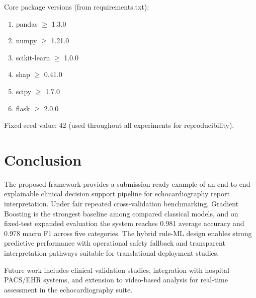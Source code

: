 \documentclass[10pt,twocolumn,letterpaper]{IEEEtran}
\begin{document}
Core package versions (from requirements.txt):
\begin{enumerate}
\item pandas $\geq$ 1.3.0
\item numpy $\geq$ 1.21.0
\item scikit-learn $\geq$ 1.0.0
\item shap $\geq$ 0.41.0
\item scipy $\geq$ 1.7.0
\item flask $\geq$ 2.0.0
\end{enumerate}

Fixed seed value: 42 (used throughout all experiments for reproducibility).

\section{Conclusion}
The proposed framework provides a submission-ready example of an end-to-end explainable clinical decision support pipeline for echocardiography report interpretation. Under fair repeated cross-validation benchmarking, Gradient Boosting is the strongest baseline among compared classical models, and on fixed-test expanded evaluation the system reaches 0.981 average accuracy and 0.978 macro F1 across five categories. The hybrid rule-ML design enables strong predictive performance with operational safety fallback and transparent interpretation pathways suitable for translational deployment studies.

Future work includes clinical validation studies, integration with hospital PACS/EHR systems, and extension to video-based analysis for real-time assessment in the echocardiography suite.
\end{document}
